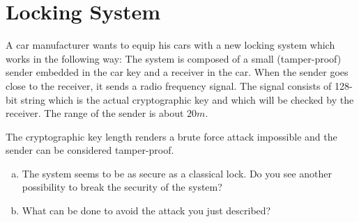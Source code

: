 \documentclass[a4paper,11pt]{article}
\newif\ifsolution\solutionfalse
\newcommand{\includeonlyinsolution}[1]{\ifsolution#1\fi}
\newenvironment{solution}%
{\par{\noindent\small\textit{Solution:}}\vspace{-12pt}\begin{framed}}%
{\end{framed}\par}
\begin{document}
\section{Locking System}
A car manufacturer wants to equip his cars with a new locking system which works in
the following way: The system is composed of a small (tamper-proof) sender embedded
in the car key and a receiver in the car. When the sender goes close to the
receiver, it sends a radio frequency signal. The signal consists of 128-bit string which is the
actual cryptographic key and which will be checked by the receiver. The range of the
sender is about $20m$.

The cryptographic key length renders a brute force attack impossible and the sender
can be considered tamper-proof.
\begin{enumerate}[(a)]
\item The system seems to be as secure as a classical lock. Do you see another
possibility to break the security of the system?
\includeonlyinsolution{\begin{solution}
The problem with this method is that when the sender emits the 128-bit string, someone
else may be eavesdropping on the given frequency. Thus, the attacker can obtain the
string and later use it for opening the car.\\
This can be either done by placing a receiver in the general area of the car and picking
up the secret key when the owner comes by, or by following the owner and reading the cryptographic
key which is constantly emitted from his car key.
\end{solution}}

\item What can be done to avoid the attack you just described?
\includeonlyinsolution{\begin{solution}
There are two (possibly more) possibilities to avoid such an attack, both of them
relying on modifying the 128-bit string at every authentication:
\begin{itemize}
  \item we can maintain a pair of public-private keys, one at the receiver (car) and one
  at the sender (key). The receiver(car) can send a random generated string
  to the sender(car-key), which will encrypt it using its private key and then send
  then send it back to the receiver. The receiver can decrypt the received message using
  the key's public key and compare it with the initial one. Thus, even if someone obtains
  the decrypted string, it cannot use it later.
  \item another solution would be to use a time-synchronized one-time password, similar to the ones
  used in bank security tokens. There must exist a synchronization between the car key and the car,
  with the string that is sent from one to another changed at a fix interval of time. Thus, even if
  one message is intercepted, it cannot be used later.
\end{itemize}
\end{solution}}


\end{enumerate}
\end{document}
